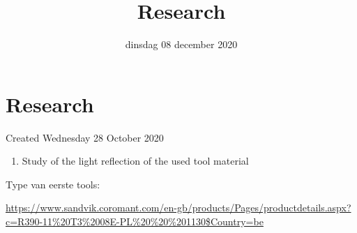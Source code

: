 \documentclass{scrartcl}
\title{Research}
\date{dinsdag 08 december 2020}
\author{}
\begin{document}
\maketitle

		\section{Research}

Created Wednesday 28 October 2020



\begin{enumerate}[1]
\item Study of the light reflection of the used tool material
\end{enumerate}




Type van eerste tools: 

\href{https://www.sandvik.coromant.com/en-gb/products/Pages/productdetails.aspx?c=R390-11%20T3%2008E-PL%20%20%201130&Country=be}{https://www.sandvik.coromant.com/en-gb/products/Pages/productdetails.aspx?c=R390-11\%20T3\%2008E-PL\%20\%20\%201130\$Country=be}
\end{document}
